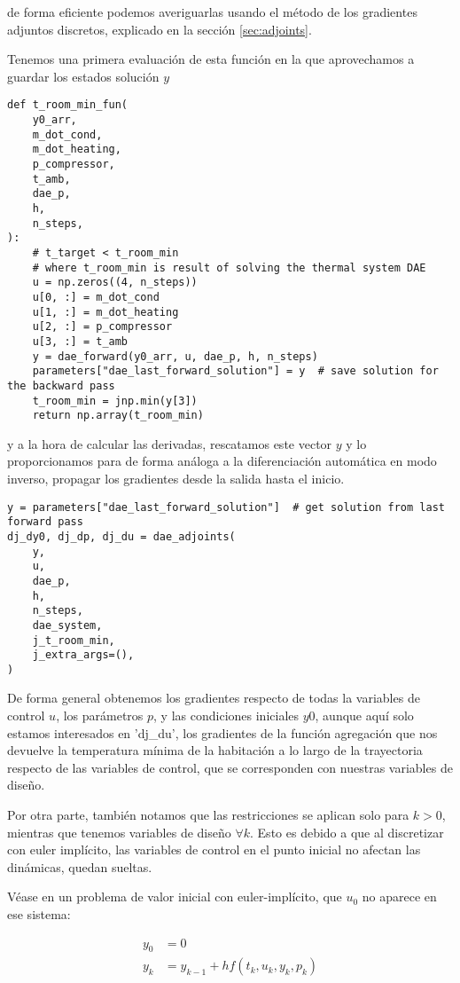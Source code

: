 de forma eficiente podemos averiguarlas usando el método de los gradientes
adjuntos discretos, explicado en la sección \ref{sec:adjoints}.

Tenemos una primera evaluación de esta función en la que aprovechamos a guardar
los estados solución $y$

\begin{verbatim}
def t_room_min_fun(
    y0_arr,
    m_dot_cond,
    m_dot_heating,
    p_compressor,
    t_amb,
    dae_p,
    h,
    n_steps,
):
    # t_target < t_room_min
    # where t_room_min is result of solving the thermal system DAE
    u = np.zeros((4, n_steps))
    u[0, :] = m_dot_cond
    u[1, :] = m_dot_heating
    u[2, :] = p_compressor
    u[3, :] = t_amb
    y = dae_forward(y0_arr, u, dae_p, h, n_steps)
    parameters["dae_last_forward_solution"] = y  # save solution for the backward pass
    t_room_min = jnp.min(y[3])
    return np.array(t_room_min)
\end{verbatim}

y a la hora de calcular las derivadas, rescatamos este vector $y$ y lo
proporcionamos para de forma análoga a la diferenciación automática en modo
inverso, propagar los gradientes desde la salida hasta el inicio.

\begin{verbatim}
y = parameters["dae_last_forward_solution"]  # get solution from last forward pass
dj_dy0, dj_dp, dj_du = dae_adjoints(
    y,
    u,
    dae_p,
    h,
    n_steps,
    dae_system,
    j_t_room_min,
    j_extra_args=(),
)
\end{verbatim}

De forma general obtenemos los gradientes respecto de todas la variables de
control $u$, los parámetros $p$, y las condiciones iniciales $y0$, aunque aquí
solo estamos interesados en 'dj\_du', los gradientes de la función agregación
que nos devuelve la temperatura mínima de la habitación a lo largo de la
trayectoria respecto de las variables de control, que se corresponden con
nuestras variables de diseño.


Por otra parte, también notamos que las restricciones se aplican solo para
$k > 0$, mientras que tenemos variables de diseño $\forall k$. Esto es debido
a que al discretizar con euler implícito, las variables de control en el
punto inicial no afectan las dinámicas, quedan sueltas.

Véase en un problema de valor inicial con euler-implícito, que $u_0$ no aparece
en ese sistema:

\begin{align*}
	y_0 & = 0                                 \\
	y_k & = y_{k-1} + h f(t_k, u_k, y_k, p_k)
\end{align*}

